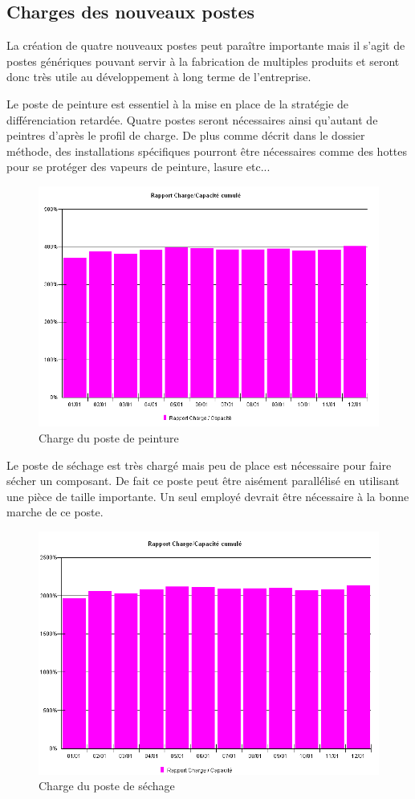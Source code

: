 \documentclass[a4paper]{../TPInsa}
\begin{document}
	\subsection{Charges des nouveaux postes}
	La création de quatre nouveaux postes peut paraître importante mais il s'agit de postes génériques pouvant servir à la fabrication de multiples produits et seront donc très utile au développement à long terme de l'entreprise. 
	
	Le poste de peinture est essentiel à la mise en place de la stratégie de différenciation retardée. Quatre postes seront nécessaires ainsi qu'autant de peintres d'après le profil de charge. De plus comme décrit dans le dossier méthode, des installations spécifiques pourront être nécessaires comme des hottes pour se protéger des vapeurs de peinture, lasure etc...
	\begin{figure}[H]
	\centering
	\includegraphics[scale=0.6]{captures/charge_pein.PNG}
	\caption{Charge du poste de peinture}
	\end{figure}
	
	Le poste de séchage est très chargé mais peu de place est nécessaire pour faire sécher un composant. De fait ce poste peut être aisément parallélisé en utilisant une pièce de taille importante. Un seul employé devrait être nécessaire à la bonne marche de ce poste.
	\begin{figure}[H]
	\centering
	\includegraphics[scale=0.6]{captures/sechage.PNG}
	\caption{Charge du poste de séchage}
	\end{figure}
	
\end{document}
